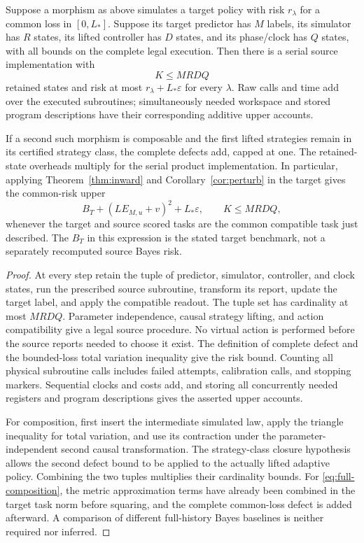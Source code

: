 \begin{theorem}\label{thm:morphism}
Suppose a morphism as above simulates a target policy with risk $r_\lambda$ for a common loss in $[0,L_*]$. Suppose its target predictor has $M$ labels, its simulator has $R$ states, its lifted controller has $D$ states, and its phase/clock has $Q$ states, with all bounds on the complete legal execution. Then there is a serial source implementation with
\begin{equation}\label{eq:resource-product}
 K\le MRDQ
\end{equation}
retained states and risk at most $r_\lambda+L_*\varepsilon$ for every $\lambda$. Raw calls and time add over the executed subroutines; simultaneously needed workspace and stored program descriptions have their corresponding additive upper accounts.

If a second such morphism is composable and the first lifted strategies remain in its certified strategy class, the complete defects add, capped at one. The retained-state overheads multiply for the serial product implementation. In particular, applying Theorem~\ref{thm:inward} and Corollary~\ref{cor:perturb} in the target gives the common-risk upper
\begin{equation}\label{eq:full-composition}
 B_T+(L E_{M,u}+v)^2+L_*\varepsilon,
 \qquad K\le MRDQ,
\end{equation}
whenever the target and source scored tasks are the common compatible task just described. The $B_T$ in this expression is the stated target benchmark, not a separately recomputed source Bayes risk.
\end{theorem}
\begin{proof}
At every step retain the tuple of predictor, simulator, controller, and clock states, run the prescribed source subroutine, transform its report, update the target label, and apply the compatible readout. The tuple set has cardinality at most $MRDQ$. Parameter independence, causal strategy lifting, and action compatibility give a legal source procedure. No virtual action is performed before the source reports needed to choose it exist. The definition of complete defect and the bounded-loss total variation inequality give the risk bound. Counting all physical subroutine calls includes failed attempts, calibration calls, and stopping markers. Sequential clocks and costs add, and storing all concurrently needed registers and program descriptions gives the asserted upper accounts.

For composition, first insert the intermediate simulated law, apply the triangle inequality for total variation, and use its contraction under the parameter-independent second causal transformation. The strategy-class closure hypothesis allows the second defect bound to be applied to the actually lifted adaptive policy. Combining the two tuples multiplies their cardinality bounds. For \eqref{eq:full-composition}, the metric approximation terms have already been combined in the target task norm before squaring, and the complete common-loss defect is added afterward. A comparison of different full-history Bayes baselines is neither required nor inferred.
\end{proof}


